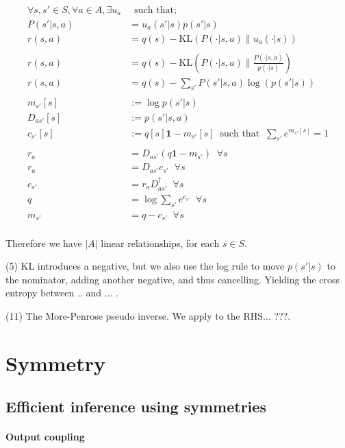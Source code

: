 \begin{align}
\forall s, s' \in S, \forall a \in A, \exists u_a& \;\;\text{such that;} \tag{1}\\
P(s' | s, a) &= u_a(s'|s)p(s'|s) \tag{2}\\
r(s, a) &= q(s) - \text{KL}(P(\cdot | s, a) \parallel u_a(\cdot| s) ) \tag{3}\\
\\
r(s, a) &= q(s) - \text{KL}(P(\cdot | s, a)\parallel\frac{P(\cdot | s, a)}{p(\cdot|s)}) \tag{4}\\
r(s, a) &= q(s) - \sum_{s'}P(s' | s, a) \log(p(s'|s)) \tag{5}\\
\\
m_{s'}[s]&:= \log p(s' | s) \tag{6}\\
D_{as'}[s] &:= p(s'|s, a) \tag{7}\\
c_{s'}[s] &:= q[s] \mathbf 1 - m_{s'}[s] \;\;\text{such that} \;\; \sum_{s'} e^{m_{s'}[s]} = 1 \tag{8}\\
\\
r_a &= D_{as'} ( q \mathbf 1 - m_{s'}) \;\;\forall s \tag{9}\\
r_a &= D_{as'}c_{s'}  \;\;\forall s \tag{10}\\
c_{s'} &= r_aD_{as'}^{\dagger} \;\;\forall s\tag{11}\\
q &= \log \sum_{s'} e^{c_{s'}} \;\;\forall s\tag{12}\\
m_{s'} &= q - c_{s'} \;\;\forall s\tag{14}\\
\end{align}


Therefore we have $|A|$ linear relationships, for each $s\in S$.

(5) KL introduces a negative, but we also use the log rule to move $p(s'|s)$ to the nominator, adding another negative, and thus cancelling. Yielding the cross entropy between .. and ... .

(11) The More-Penrose pseudo inverse. We apply to the RHS... ???.

\section{Symmetry}

\subsection{Efficient inference using symmetries}\label{symmetry-inference}

\paragraph{Output coupling}

